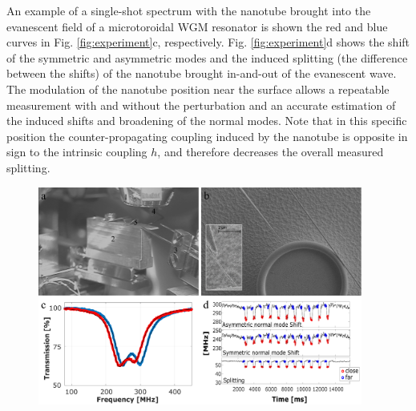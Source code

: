 \documentclass[journal=jacsat,manuscript=article]{achemso}
\begin{document}
An example of a single-shot spectrum with the nanotube brought into the evanescent field of a microtoroidal WGM resonator is shown the red and blue curves in Fig. \ref{fig:experiment}c, respectively. Fig. \ref{fig:experiment}d shows the shift of the symmetric and asymmetric modes and the induced splitting (the difference between the shifts) of the nanotube brought in-and-out of the evanescent wave. The modulation of the nanotube position near the surface allows a repeatable measurement with and without the perturbation and an accurate estimation of the induced shifts and broadening of the normal modes. Note that in this specific position the counter-propagating coupling induced by the nanotube is opposite in sign to the intrinsic coupling $h$, and therefore decreases the overall measured splitting.

\begin{figure}[H]
\centering
          \includegraphics[width=0.95\textwidth]{Images/figure_3_v4.png}

\end{figure}
\end{document}
